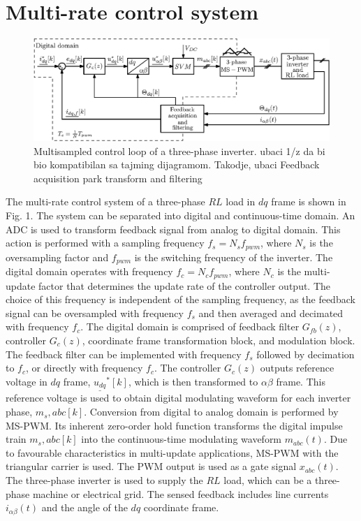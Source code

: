 \documentclass[journal]{IEEEtran}
\begin{document}
\section{Multi-rate control system}

\begin{figure}[t!]
    \centerline{\includegraphics[width=0.95\linewidth]{figures/schematic.eps}}
    \caption{Multisampled control loop of a three-phase inverter. ubaci 1/z da bi bio kompatibilan sa tajming dijagramom. Takodje, ubaci Feedback acquisition park transform and filtering}
    \label{fig:MSControl}
\end{figure}

The multi-rate control system of a three-phase $RL$ load in $dq$ frame is shown in Fig. 1. The system can be separated into digital and continuous-time domain. An ADC is used to transform feedback signal from analog to digital domain. This action is performed with a sampling frequency $f_s = N_s f_{pwm}$, where $N_s$ is the oversampling factor and $f_{pwm}$ is the switching frequency of the inverter. The digital domain operates with frequency $f_c = N_c f_{pwm}$, where $N_c$ is the multi-update factor that determines the update rate of the controller output. The choice of this frequency is independent of the sampling frequency, as the feedback signal can be oversampled with frequency $f_s$ and then averaged and decimated with frequency $f_c$. The digital domain is comprised of feedback filter $G_{fb}(z)$, controller $G_c(z)$, coordinate frame transformation block, and modulation block. The feedback filter can be implemented with frequency $f_s$ followed by decimation to $f_c$, or directly with frequency $f_c$. The controller $G_c(z)$ outputs reference voltage in $dq$ frame, $\underline{u_{dq}}^*[k]$, which is then transformed to $\alpha \beta$ frame. This reference voltage is used to obtain digital modulating waveform for each inverter phase, $m_s,{abc}[k]$. Conversion from digital to analog domain is performed by MS-PWM. Its inherent zero-order hold function transforms the digital impulse train $m_s,{abc}[k]$ into the continuous-time modulating waveform $m_{abc}(t)$. Due to favourable characteristics in multi-update applications, MS-PWM with the triangular carrier is used. The PWM output is used as a gate signal $x_{abc}(t)$. The three-phase inverter is used to supply the $RL$ load, which can be a three-phase machine or electrical grid. The sensed feedback includes line currents $i_{\alpha \beta}(t)$ and the angle of the $dq$ coordinate frame. 
\end{document}
